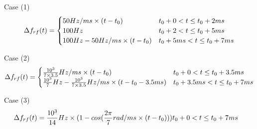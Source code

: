 %
%
%
%

Case (1) 
\begin{eqnarray}\Delta f_{rf}(t)=
\begin{cases}
50Hz/ms \times (t-t_0) &t_0+0<t\le t_0+2ms\cr  100Hz &t_0+2<t\le t_0+5ms \cr 100Hz-50Hz/ms \times (t-t_0) &t_0+5ms<t\le t_0+7ms\cr 
\end{cases}
\end{eqnarray}

Case (2) 
\begin{eqnarray}\Delta f_{rf}(t)=
\begin{cases}
\frac{10^3}{7\times 3.5}Hz/ms \times (t-t_0) &t_0+0<t\le t_0+3.5ms\cr  \frac{10^3}{7}Hz-{\frac{10^3}{7\times 3.5}Hz/ms}\times {(t-t_0-3.5ms)} &t_0+3.5ms<t\le t_0+7ms \cr 
\end{cases}
\end{eqnarray}

Case (3) 
\begin{eqnarray}\Delta f_{rf}(t)=
\frac{10^3}{14}Hz \times (1-cos(\frac{2\pi}{7} rad/ms\times (t-t_0))) &t_0+0<t\le t_0+7ms\cr  
\end{eqnarray}

